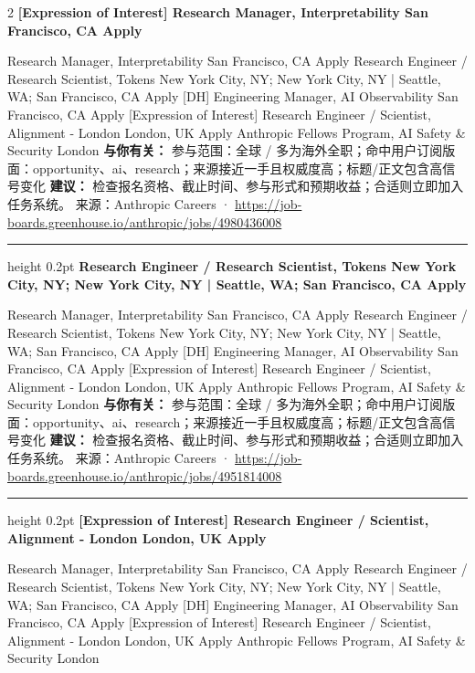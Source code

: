 \documentclass[10.5pt]{ctexart}
\begin{document}
\begin{multicols}{2}
{\large\bfseries [Expression of Interest] Research Manager, Interpretability San Francisco, CA Apply}\par
[Expression of Interest] Research Manager, Interpretability San Francisco, CA Apply Research Engineer / Research Scientist, Tokens New York City, NY; New York City, NY | Seattle, WA; San Francisco, CA Apply [DH] Engineering Manager, AI Observability San Francisco, CA Apply [Expression of Interest] Research Engineer / Scientist, Alignment - London London, UK Apply Anthropic Fellows Program, AI Safety \& Security London
\textbf{与你有关：} 参与范围：全球 / 多为海外全职；命中用户订阅版面：opportunity、ai、research；来源接近一手且权威度高；标题/正文包含高信号变化
\textbf{建议：} 检查报名资格、截止时间、参与形式和预期收益；合适则立即加入任务系统。
{\footnotesize\color{ormuted} 来源：Anthropic Careers · \url{https://job-boards.greenhouse.io/anthropic/jobs/4980436008}}
\vspace{2mm}
\hrule height 0.2pt
\vspace{2mm}
{\large\bfseries Research Engineer / Research Scientist, Tokens New York City, NY; New York City, NY | Seattle, WA; San Francisco, CA Apply}\par
[Expression of Interest] Research Manager, Interpretability San Francisco, CA Apply Research Engineer / Research Scientist, Tokens New York City, NY; New York City, NY | Seattle, WA; San Francisco, CA Apply [DH] Engineering Manager, AI Observability San Francisco, CA Apply [Expression of Interest] Research Engineer / Scientist, Alignment - London London, UK Apply Anthropic Fellows Program, AI Safety \& Security London
\textbf{与你有关：} 参与范围：全球 / 多为海外全职；命中用户订阅版面：opportunity、ai、research；来源接近一手且权威度高；标题/正文包含高信号变化
\textbf{建议：} 检查报名资格、截止时间、参与形式和预期收益；合适则立即加入任务系统。
{\footnotesize\color{ormuted} 来源：Anthropic Careers · \url{https://job-boards.greenhouse.io/anthropic/jobs/4951814008}}
\vspace{2mm}
\hrule height 0.2pt
\vspace{2mm}
{\large\bfseries [Expression of Interest] Research Engineer / Scientist, Alignment - London London, UK Apply}\par
[Expression of Interest] Research Manager, Interpretability San Francisco, CA Apply Research Engineer / Research Scientist, Tokens New York City, NY; New York City, NY | Seattle, WA; San Francisco, CA Apply [DH] Engineering Manager, AI Observability San Francisco, CA Apply [Expression of Interest] Research Engineer / Scientist, Alignment - London London, UK Apply Anthropic Fellows Program, AI Safety \& Security London

\end{multicols}
\end{document}
